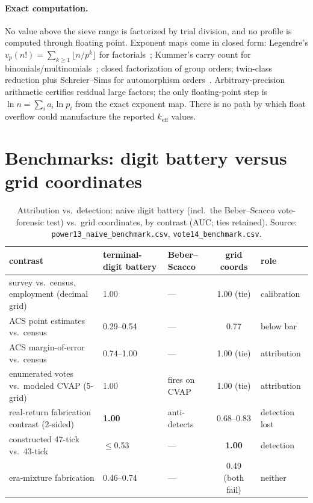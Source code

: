 \documentclass[12pt]{article}
\newcommand{\keff}{k_{\mathrm{eff}}}
\begin{document}
\paragraph{Exact computation.}
No value above the sieve range is factorized by trial division, and no profile
is computed through floating point. Exponent maps come in closed form:
Legendre's $v_p(n!) = \sum_{k\ge1} \lfloor n/p^k \rfloor$ for
factorials~\citep{legendre1808}; Kummer's carry count for
binomials/multinomials~\citep{kummer1852}; closed factorization of group
orders; twin-class reduction plus Schreier--Sims for automorphism
orders~\citep{seress2003}.
Arbitrary-precision arithmetic certifies residual large factors; the only
floating-point step is $\ln n = \sum_i a_i \ln p_i$ from the exact exponent
map. There is no path by which float overflow could manufacture the reported
$\keff$ values.

\section{Benchmarks: digit battery versus grid coordinates}
\label{s:bench}

\begin{table}[t]
\centering
\caption{Attribution vs.\ detection: naive digit battery (incl.\ the
Beber--Scacco vote-forensic test) vs.\ grid coordinates, by contrast (AUC;
ties retained). Source: \texttt{power13\_naive\_benchmark.csv},
\texttt{vote14\_benchmark.csv}.}
\label{tab:naive}
\footnotesize
\setlength{\tabcolsep}{4pt}
\begin{tabular}{p{4.1cm}p{1.9cm}p{1.6cm}cp{1.6cm}}
\toprule
contrast & terminal-digit battery & Beber--Scacco & grid coords & role \\
\midrule
survey vs.\ census, employment (decimal grid) & 1.00 & --- & 1.00 (tie) & calibration \\
ACS point estimates vs.\ census & 0.29--0.54 & --- & 0.77 & below bar \\
ACS margin-of-error vs.\ census & 0.74--1.00 & --- & 1.00 (tie) & attribution \\
enumerated votes vs.\ modeled CVAP (5-grid) & 1.00 & fires on CVAP & 1.00 (tie) & attribution \\
real-return fabrication contrast (2-sided) & \textbf{1.00} & anti-detects & 0.68--0.83 & detection lost \\
constructed 47-tick vs.\ 43-tick & $\le$0.53 & --- & \textbf{1.00} & detection \\
era-mixture fabrication & 0.46--0.74 & --- & 0.49 (both fail) & neither \\
\bottomrule
\end{tabular}
\end{table}
\end{document}
